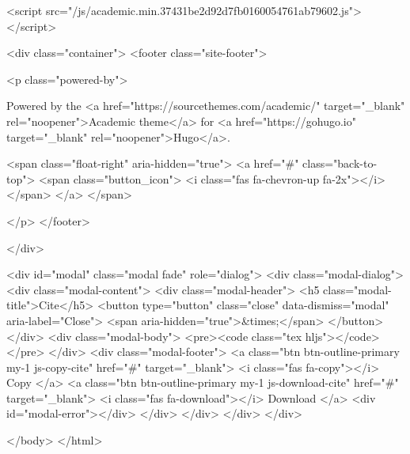     <script src="/js/academic.min.37431be2d92d7fb0160054761ab79602.js"></script>










  <div class="container">
    <footer class="site-footer">


  <p class="powered-by">


    Powered by the
    <a href="https://sourcethemes.com/academic/" target="_blank" rel="noopener">Academic theme</a> for
    <a href="https://gohugo.io" target="_blank" rel="noopener">Hugo</a>.


    <span class="float-right" aria-hidden="true">
      <a href="#" class="back-to-top">
        <span class="button_icon">
          <i class="fas fa-chevron-up fa-2x"></i>
        </span>
      </a>
    </span>

  </p>
</footer>

  </div>



<div id="modal" class="modal fade" role="dialog">
  <div class="modal-dialog">
    <div class="modal-content">
      <div class="modal-header">
        <h5 class="modal-title">Cite</h5>
        <button type="button" class="close" data-dismiss="modal" aria-label="Close">
          <span aria-hidden="true">&times;</span>
        </button>
      </div>
      <div class="modal-body">
        <pre><code class="tex hljs"></code></pre>
      </div>
      <div class="modal-footer">
        <a class="btn btn-outline-primary my-1 js-copy-cite" href="#" target="_blank">
          <i class="fas fa-copy"></i> Copy
        </a>
        <a class="btn btn-outline-primary my-1 js-download-cite" href="#" target="_blank">
          <i class="fas fa-download"></i> Download
        </a>
        <div id="modal-error"></div>
      </div>
    </div>
  </div>
</div>

</body>
</html>
